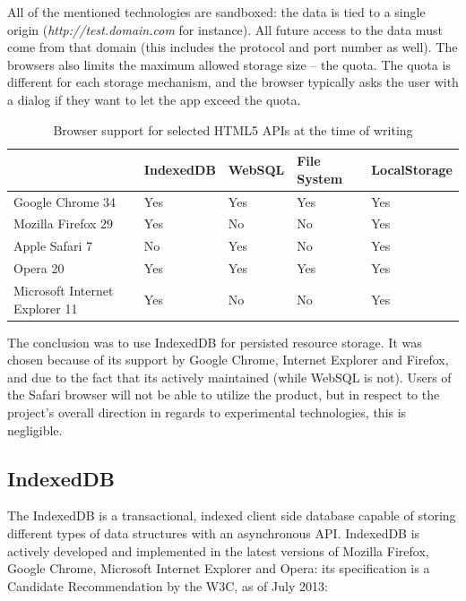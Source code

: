 All of the mentioned technologies are sandboxed: the data is tied to a single origin (\emph{http://test.domain.com} for instance). All future access to the data must come from that domain (this includes the protocol and port number as well). The browsers also limits the maximum allowed storage size – the quota. The quota is different for each storage mechanism, and the browser typically asks the user with a dialog if they want to let the app exceed the quota.

\begin{table}
    \begin{tabular}{|l|l|l|l|l|}
    \hline
                       & IndexedDB & WebSQL & File System & LocalStorage \\ \hline
    Google Chrome 34               & Yes       & Yes    & Yes  & Yes                      \\ \hline
    Mozilla Firefox 29             & Yes       & \cellcolor{red}No  & \cellcolor{red}No   & Yes                        \\ \hline
    Apple Safari 7                & \cellcolor{red}No        & Yes  & \cellcolor{red}No    & Yes                        \\ \hline
    Opera 20                       & Yes       & Yes    & Yes  & Yes                      \\ \hline
    Microsoft Internet Explorer 11 & Yes       & \cellcolor{red}No  & \cellcolor{red}No   & Yes                        \\ \hline
    \end{tabular}
    \caption {Browser support for selected HTML5 APIs at the time of writing}
\end{table}

The conclusion was to use IndexedDB for persisted resource storage. It was chosen because of its support by Google Chrome, Internet Explorer and Firefox, and due to the fact that its actively maintained (while WebSQL is not). Users of the Safari browser will not be able to utilize the product, but in respect to the project's overall direction in regards to experimental technologies, this is negligible.

\subsection{IndexedDB}
\label{sec:indexeddb}
The IndexedDB is a transactional, indexed client side database capable of storing different types of data structures with an asynchronous API. IndexedDB is actively developed and implemented in the latest versions of Mozilla Firefox, Google Chrome, Microsoft Internet Explorer and Opera: its specification is a Candidate Recommendation by the W3C, as of July 2013\cite{IndexedDB:Online}:


